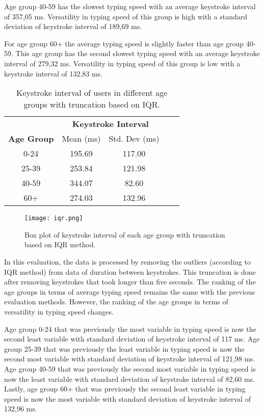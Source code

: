 Age group 40-59 has the slowest typing speed with an average keystroke interval of 357,05 ms.
Versatility in typing speed of this group is high with a standard deviation of keystroke interval of 189,69 ms.

For age group 60+ the average typing speed is slightly faster than age group 40-59.
This age group has the second slowest typing speed with an average keystroke interval of 279,32 ms.
Versatility in typing speed of this group is low with a keystroke interval of 132,83 ms.

\begin{table}[h]
    \centering
    \begin{tabular}{ccccc}
    \toprule
    \multicolumn{1}{c}{} & \multicolumn{2}{c}{\textbf{Keystroke Interval}}\\
    \cmidrule(rl){2-3} \cmidrule(rl){4-5}
    \textbf{Age Group} & {Mean (ms)} & {Std. Dev (ms)} \\
    \midrule
    0-24 & 195.69 & 117.00 \\
    25-39 & 253.84 & 121.98  \\
    40-59 & 344.07 & 82.60  \\
    60+ & 274.03 & 132.96 \\
    \bottomrule
    \end{tabular}
    \caption{Keystroke interval of users in different age groups with truncation based on \ac{IQR}.}
    \label{tab:typing_behavior_iqr}
\end{table}


\begin{figure}[h!]
    \centering
    \texttt{[image: iqr.png]}
    \caption{Box plot of keystroke interval of each age group with truncation based on \ac{IQR} method.}
    \label{box_plot_typing_speed_iqr}
\end{figure}

In this evaluation, the data is processed by removing the outliers (according to \ac{IQR} method) from data of duration between keystrokes.
This truncation is done after removing keystrokes that took longer than five seconds.
The ranking of the age groups in terms of average typing speed remains the same with the previous evaluation methods.
However, the ranking of the age groups in terms of versatility in typing speed changes.

Age group 0-24 that was previously the most variable in typing speed is now the second least variable with standard deviation of keystroke interval of 117 ms.
Age group 25-39 that was previously the least variable in typing speed is now the second most variable with standard deviation of keystroke interval of 121,98 ms.
Age group 40-59 that was previously the second most variable in typing speed is now the least variable with standard deviation of keystroke interval of 82,60 ms.
Lastly, age group 60+ that was previously the second least variable in typing speed is now the most variable with standard deviation of keystroke interval of 132,96 ms. 

